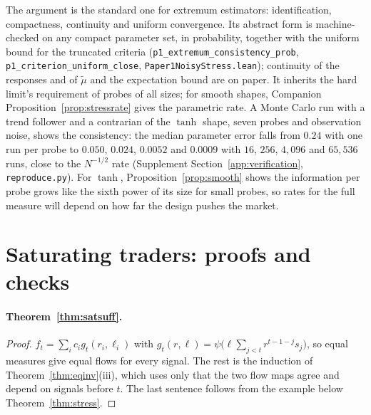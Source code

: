 \documentclass[12pt]{article}
\theoremstyle{definition}
\theoremstyle{remark}
\begin{document}
The argument is the standard one for extremum estimators: identification, compactness, continuity and uniform convergence. Its abstract form is machine-checked on any compact parameter set, in probability, together with the uniform bound for the truncated criteria (\texttt{p1\_extremum\_consistency\_prob}, \texttt{p1\_criterion\_uniform\_close}, \nolinkurl{Paper1NoisyStress.lean}); continuity of the responses and of $\tilde\mu$ and the expectation bound are on paper. It inherits the hard limit's requirement of probes of all sizes; for smooth shapes, Companion Proposition~\ref{prop:stressrate} gives the parametric rate. A Monte Carlo run with a trend follower and a contrarian of the $\tanh$ shape, seven probes and observation noise, shows the consistency: the median parameter error falls from $0.24$ with one run per probe to $0.050$, $0.024$, $0.0052$ and $0.0009$ with $16$, $256$, $4{,}096$ and $65{,}536$ runs, close to the $N^{-1/2}$ rate (Supplement Section~\ref{app:verification}, \nolinkurl{reproduce.py}). For $\tanh$, Proposition~\ref{prop:smooth} shows the information per probe grows like the sixth power of its size for small probes, so rates for the full measure will depend on how far the design pushes the market.

\section{Saturating traders: proofs and checks}\label{app:saturating}

\paragraph{Theorem~\ref{thm:satsuff}.}
\begin{proof}
$f_t=\sum_ic_ig_t(r_i,\ell_i)$ with $g_t(r,\ell)=\psi\bigl(\ell\sum_{j<t}r^{t-1-j}s_j\bigr)$, so equal measures give equal flows for every signal. The rest is the induction of Theorem~\ref{thm:eqinv}(iii), which uses only that the two flow maps agree and depend on signals before $t$. The last sentence follows from the example below Theorem~\ref{thm:stress}.
\end{proof}
\end{document}
